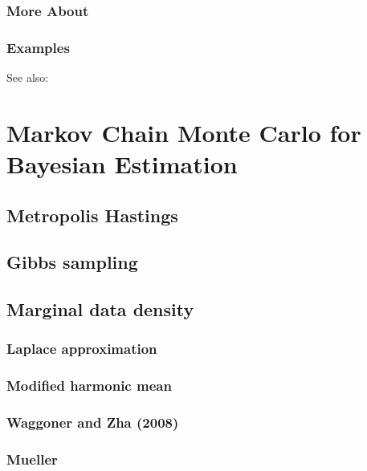 \documentclass[letterpaper,10pt,english]{sphinxmanual}
\begin{document}
\subsection{More About}
\label{classes/time_series/@ts/ts:id614}

\subsection{Examples}
\label{classes/time_series/@ts/ts:id615}
See also:


\chapter{Markov Chain Monte Carlo for Bayesian Estimation}
\label{mcmc::doc}\label{mcmc:markov-chain-monte-carlo-for-bayesian-estimation}

\section{Metropolis Hastings}
\label{mcmc:metropolis-hastings}

\section{Gibbs sampling}
\label{mcmc:gibbs-sampling}

\section{Marginal data density}
\label{mcmc:marginal-data-density}

\subsection{Laplace approximation}
\label{mcmc:laplace-approximation}

\subsection{Modified harmonic mean}
\label{mcmc:modified-harmonic-mean}

\subsection{Waggoner and Zha (2008)}
\label{mcmc:waggoner-and-zha-2008}

\subsection{Mueller}
\label{mcmc:mueller}
\end{document}
